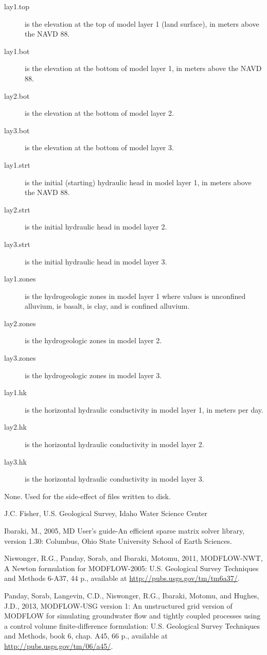 \documentclass[letterpaper]{book}
\begin{document}
\begin{Details}
\begin{description}
\item[lay1.top] is the elevation at the top of model layer 1 (land surface), in meters above the NAVD 88.
\item[lay1.bot] is the elevation at the bottom of model layer 1, in meters above the NAVD 88.
\item[lay2.bot] is the elevation at the bottom of model layer 2.
\item[lay3.bot] is the elevation at the bottom of model layer 3.
\item[lay1.strt] is the initial (starting) hydraulic head in model layer 1, in meters above the NAVD 88.
\item[lay2.strt] is the initial hydraulic head in model layer 2.
\item[lay3.strt] is the initial hydraulic head in model layer 3.
\item[lay1.zones] is the hydrogeologic zones in model layer 1 where values  is unconfined alluvium,  is basalt,  is clay, and  is confined alluvium.
\item[lay2.zones] is the hydrogeologic zones in model layer 2.
\item[lay3.zones] is the hydrogeologic zones in model layer 3.
\item[lay1.hk] is the horizontal hydraulic conductivity in model layer 1, in meters per day.
\item[lay2.hk] is the horizontal hydraulic conductivity in model layer 2.
\item[lay3.hk] is the horizontal hydraulic conductivity in model layer 3.

\end{description}

\end{Details}
%
\begin{Value}
None. Used for the side-effect of files written to disk.
\end{Value}
%
\begin{Author}\relax
J.C. Fisher, U.S. Geological Survey, Idaho Water Science Center
\end{Author}
%
\begin{References}\relax
Ibaraki, M., 2005, \eqn{\chi}{}MD User's guide-An efficient sparse matrix solver library, version 1.30: Columbus, Ohio State University School of Earth Sciences.

Niswonger, R.G., Panday, Sorab, and Ibaraki, Motomu, 2011, MODFLOW-NWT, A Newton formulation for MODFLOW-2005: U.S. Geological Survey Techniques and Methods 6-A37, 44 p., available at \url{http://pubs.usgs.gov/tm/tm6a37/}.

Panday, Sorab, Langevin, C.D., Niswonger, R.G., Ibaraki, Motomu, and Hughes, J.D., 2013, MODFLOW-USG version 1: An unstructured grid version of MODFLOW for simulating groundwater flow and tightly coupled processes using a control volume finite-difference formulation: U.S. Geological Survey Techniques and Methods, book 6, chap. A45, 66 p., available at \url{http://pubs.usgs.gov/tm/06/a45/}.
\end{References}
\end{document}
